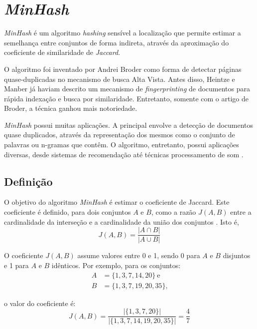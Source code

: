 \section{\emph{MinHash}}\label{sec:minhash}

\emph{MinHash} é um algoritmo \emph{hashing} sensível a localização que permite estimar a semelhança entre conjuntos de forma indireta, através da aproximação do coeficiente de similaridade de \emph{Jaccard}. 

O algoritmo foi inventado por Andrei Broder \cite{broder1997resemblance} como forma de detectar páginas quase-duplicadas no mecanismo de busca Alta Vista. Antes disso, Heintze \cite{heintze1996scalable} e Manber \cite{manber1994finding} já haviam descrito um mecanismo de \emph{fingerprinting} de documentos para rápida indexação e busca por similaridade.  Entretanto, somente com o artigo de Broder, a técnica ganhou mais notoriedade.

\emph{MinHash} possui muitas aplicações. A principal envolve a detecção de documentos quase duplicados, através da representação dos mesmos como o conjunto de palavras ou n-gramas que contêm. O algoritmo, entretanto, possui aplicações diversas, desde sistemas de recomendação \cite{das2007google} até técnicas processamento de som \cite{chiu2010background,covell2007known}.

\subsection{Definição}

O objetivo do algoritmo \emph{MinHash} é estimar o coeficiente de Jaccard. Este coeficiente é definido, para dois conjuntos $A$ e $B$, como a razão $J(A, B)$ entre a cardinalidade da interseção e a cardinalidade da união dos conjuntos \cite{real1996probabilistic}. Isto é,
\[
J(A, B) = \frac{| A \cap B |}{| A \cup B|}
\]

O coeficiente $J(A, B)$ assume valores entre 0 e 1, sendo 0 para $A$ e $B$ disjuntos e 1 para $A$ e $B$ idênticos. Por exemplo, para os conjuntos:
\[
\begin{split}
A &= \{1, 3, 7, 14, 20\}\ \text{e} \\
B &= \{1, 3, 7, 19, 20, 35\}\text{,}
\end{split}
\]

o valor do coeficiente é:
\[
J(A, B) = \frac{ |\{1, 3, 7, 20 \}| }{ |\{1, 3, 7, 14, 19, 20, 35\}| } = \frac{4}{7}
\]

